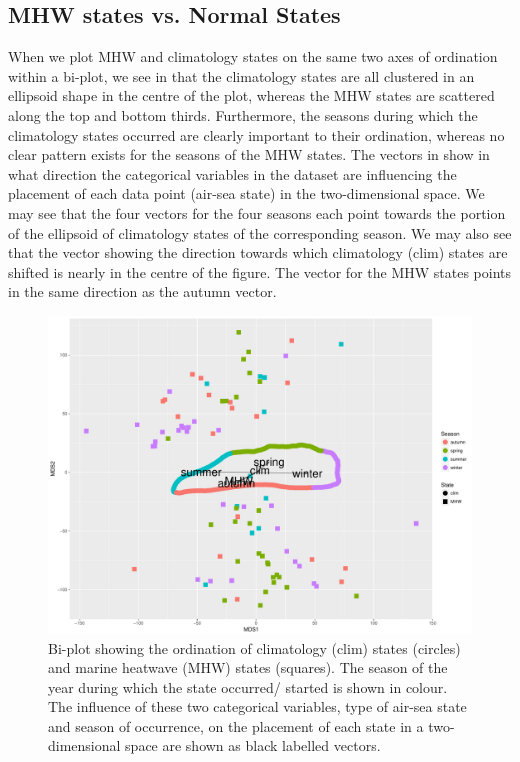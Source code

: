 \documentclass[a4paper,10pt,review]{elsarticle}
\begin{document}
\subsection{MHW states vs. Normal States}
When we plot MHW and climatology states on the same two axes of ordination within a bi-plot, we see in  that the climatology states are all clustered in an ellipsoid shape in the centre of the plot, whereas the MHW states are scattered along the top and bottom thirds. Furthermore, the seasons during which the climatology states occurred are clearly important to their ordination, whereas no clear pattern exists for the seasons of the MHW states. The vectors in  show in what direction the categorical variables in the dataset are influencing the placement of each data point (air-sea state) in the two-dimensional space. We may see that the four vectors for the four seasons each point towards the portion of the ellipsoid of climatology states of the corresponding season. We may also see that the vector showing the direction towards which climatology (clim) states are shifted is nearly in the centre of the figure. The vector for the MHW states points in the same direction as the autumn vector.

\begin{figure}
\includegraphics[width=1.0\textwidth]{figure_3.pdf}
\caption{Bi-plot showing the ordination of climatology (clim) states (circles) and marine heatwave (MHW) states (squares). The season of the year during which the state occurred/ started is shown in colour. The influence of these two categorical variables, type of air-sea state and season of occurrence, on the placement of each state in a two-dimensional space are shown as black labelled vectors.}
\label{figure3}
\end{figure}
\end{document}
